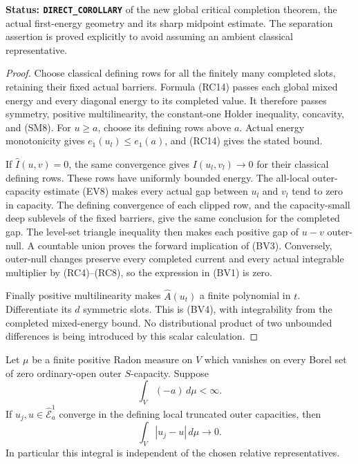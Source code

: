 \noindent\textbf{Status: \texttt{DIRECT\_COROLLARY}}
of the new global critical completion theorem,
the actual first-energy geometry and its sharp
midpoint estimate.  The separation assertion is
proved explicitly to avoid assuming an ambient
classical representative.

\begin{proof}
Choose classical defining rows for all the
finitely many completed slots, retaining their
fixed actual barriers.  Formula (RC14) passes
each global mixed energy and every diagonal
energy to its completed value.  It therefore
passes symmetry, positive multilinearity,
the constant-one Holder inequality, concavity,
and (SM8).  For $u\geq a$, choose its defining
rows above $a$.  Actual energy monotonicity
gives $e_1(u_l)\leq e_1(a)$, and (RC14)
gives the stated bound.

If $\widehat I(u,v)=0$, the same convergence
gives $I(u_l,v_l)\to0$ for their classical
defining rows.  These rows have uniformly
bounded energy.  The all-local outer-capacity
estimate (EV8) makes every actual gap between
$u_l$ and $v_l$ tend to zero in capacity.
The defining convergence of each clipped row,
and the capacity-small deep sublevels of the
fixed barriers, give the same conclusion for
the completed gap.  The level-set triangle
inequality then makes each positive gap of
$u-v$ outer-null.  A countable union proves
the forward implication of (BV3).
Conversely, outer-null changes preserve every
completed current and every actual integrable
multiplier by (RC4)--(RC8), so the expression
in (BV1) is zero.

Finally positive multilinearity makes
$\widehat A(u_t)$ a finite polynomial in $t$.
Differentiate its $d$ symmetric slots.
This is (BV4), with integrability from the
completed mixed-energy bound.  No distributional
product of two unbounded differences is being
introduced by this scalar calculation.
\end{proof}

\begin{lemma}
\label{lem:r11-barrier-diffuse-integration}
Let $\mu$ be a finite positive Radon measure on $V$
which vanishes on every Borel set of zero ordinary-open
outer $S$-capacity.  Suppose
\[
                              \int_V(-a)\,d\mu<\infty.
 \tag{BV5}
\]
If $u_j,u\in\widehat{\mathcal E}^1_a$ converge in the
defining local truncated outer capacities, then
\[
                           \int_V|u_j-u|\,d\mu\longrightarrow0.
 \tag{BV6}
\]
In particular this integral is independent of the
chosen relative representatives.
\end{lemma}

